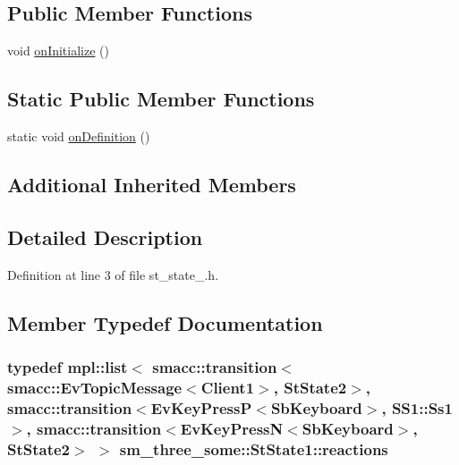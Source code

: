 \subsection*{Public Member Functions}
\begin{DoxyCompactItemize}
\item 
void \hyperlink{structsm__three__some_1_1StState1_ac57412e5c59fa38f9a58be3b56b62762}{on\+Initialize} ()
\end{DoxyCompactItemize}
\subsection*{Static Public Member Functions}
\begin{DoxyCompactItemize}
\item 
static void \hyperlink{structsm__three__some_1_1StState1_a69bbe0bcf47acd2ea803972785c23589}{on\+Definition} ()
\end{DoxyCompactItemize}
\subsection*{Additional Inherited Members}


\subsection{Detailed Description}


Definition at line 3 of file st\+\_\+state\+\_.\+h.



\subsection{Member Typedef Documentation}
\subsubsection[{\texorpdfstring{reactions}{reactions}}]{\setlength{\rightskip}{0pt plus 5cm}typedef mpl\+::list$<$ {\bf smacc\+::transition}$<${\bf smacc\+::\+Ev\+Topic\+Message}$<${\bf Client1}$>$, {\bf St\+State2}$>$, {\bf smacc\+::transition}$<${\bf Ev\+Key\+PressP}$<${\bf Sb\+Keyboard}$>$, {\bf S\+S1\+::\+Ss1}$>$, {\bf smacc\+::transition}$<${\bf Ev\+Key\+PressN}$<${\bf Sb\+Keyboard}$>$, {\bf St\+State2}$>$ $>$ {\bf sm\+\_\+three\+\_\+some\+::\+St\+State1\+::reactions}}\hypertarget{structsm__three__some_1_1StState1_a3b704f5c0b64587744c384df09ec0788}{}\label{structsm__three__some_1_1StState1_a3b704f5c0b64587744c384df09ec0788}


